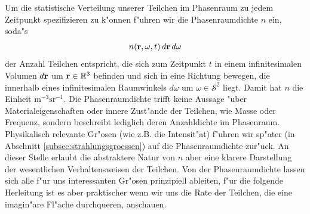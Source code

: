 	Um die statistische Verteilung unserer Teilchen im Phasenraum zu jedem Zeitpunkt spezifizieren zu k"onnen f"uhren wir die Phasenraumdichte $n$ ein, soda"s $$n(\mathbf{r},\omega,t)\,d\mathbf{r}\,d\omega$$ der Anzahl Teilchen entspricht, die sich zum Zeitpunkt $t$ in einem infinitesimalen Volumen $d\mathbf{r}$ um $\mathbf{r} \in \mathbb{R}^3$ befinden und sich in eine Richtung bewegen, die innerhalb eines infinitesimalen Raumwinkels $d\omega$ um $\omega \in \mathcal{S}^2$ liegt. Damit hat $n$ die Einheit $\text{m}^{-3}\text{sr}^{-1}$. Die Phasenraumdichte trifft keine Aussage "uber Materialeigenschaften oder innere Zust"ande der Teilchen, wie Masse oder Frequenz, sondern beschreibt lediglich deren Anzahldichte im Phasenraum. Physikalisch relevante Gr"osen (wie z.B. die Intensit"at) f"uhren wir sp"ater (in Abschnitt \ref{subsec:strahlungsgroessen}) auf die Phasenraumdichte zur"uck. An dieser Stelle erlaubt die abstraktere Natur von $n$ aber eine klarere Darstellung der wesentlichen Verhaltensweisen der Teilchen. Von der Phasenraumdichte lassen sich alle f"ur uns interessanten Gr"osen prinzipiell ableiten, f"ur die folgende Herleitung ist es aber praktischer wenn wir uns die Rate der Teilchen, die eine imagin"are Fl"ache durchqueren, anschauen.
	
